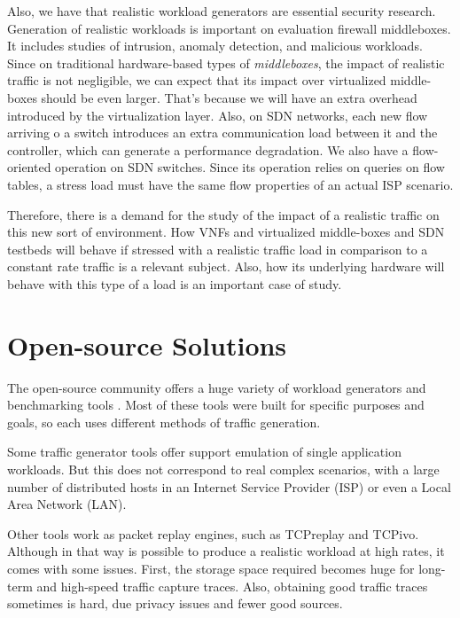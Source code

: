 Also, we have that realistic workload generators are essential security research\cite{ditg-paper}.  Generation of realistic workloads is important on evaluation firewall middleboxes. It includes studies of intrusion, anomaly detection, and malicious workloads\cite{ditg-paper}.   Since on traditional hardware-based types of \textit{middleboxes}, the impact of realistic traffic is not negligible, we can expect that its impact over virtualized middle-boxes should be even larger. That's because we will have an extra overhead introduced by the virtualization layer. Also, on SDN networks, each new flow arriving o a switch introduces an extra communication load between it and the controller, which can generate a performance degradation. 
We also have a flow-oriented operation on SDN switches. Since its operation relies on queries on flow tables, a stress load must have the same flow properties of an actual ISP scenario.

Therefore, there is a demand for the study of the impact of a realistic traffic on this new sort of environment. How VNFs and virtualized middle-boxes and SDN testbeds will behave if stressed with a realistic traffic load in comparison to a constant rate traffic is a relevant subject. Also, how its underlying hardware will behave with this type of a load is an important case of study\cite{instrumentation-framework-nfv}.  

\section{Open-source Solutions}

The open-source community offers a huge variety of workload generators and benchmarking tools \cite{ditg-paper}\cite{validate-trafficgen}\cite{comparative-trafficgen-tools}\cite{performance-trafficgen}. Most of these tools were built for specific purposes and goals, so each uses different methods of traffic generation. 

Some traffic generator tools offer support emulation of single application workloads. But this does not correspond to real complex scenarios, with a large number of distributed hosts in an Internet Service Provider (ISP) or even a Local Area Network (LAN).

Other tools work as packet replay engines, such as TCPreplay and TCPivo. Although in that way is possible to produce a realistic workload at high rates, it comes with some issues. First, the storage space required becomes huge for long-term and high-speed traffic capture traces. Also, obtaining good traffic traces sometimes is hard, due privacy issues and fewer good sources. 

